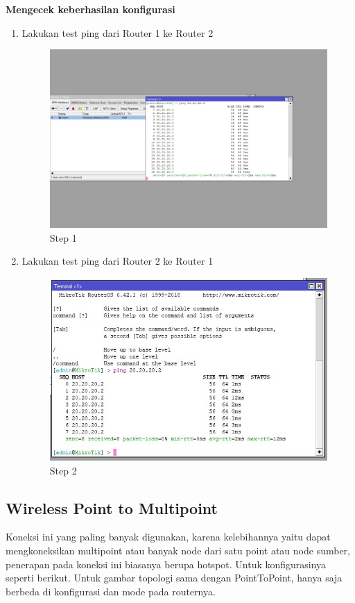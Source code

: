 \begin{center} 
	\textbf{Mengecek keberhasilan konfigurasi}
\end{center}

\begin{enumerate}
	\item Lakukan test ping dari Router 1 ke Router 2
	\begin{figure}[H]
		\centering
		\includegraphics[width=0.5\linewidth]{P1/img/hasilper1.1pc1.jpg}
		\caption{Step 1}
		\label{fig:gambar8}
	\end{figure}

	\item Lakukan test ping dari Router 2 ke Router 1
	\begin{figure}[H]
		\centering
		\includegraphics[width=0.5\linewidth]{P1/img/hasilper1pc2.jpg}
		\caption{Step 2}
		\label{fig:gambar9}
	\end{figure}

\end{enumerate}

\subsection{Wireless Point to Multipoint}
Koneksi ini yang paling banyak digunakan, karena kelebihannya yaitu dapat mengkoneksikan multipoint atau banyak node dari satu point atau node sumber, penerapan pada koneksi ini biasanya berupa
hotspot. Untuk konfigurasinya seperti berikut. Untuk gambar topologi sama dengan PointToPoint,
hanya saja berbeda di konfigurasi dan mode pada routernya.

